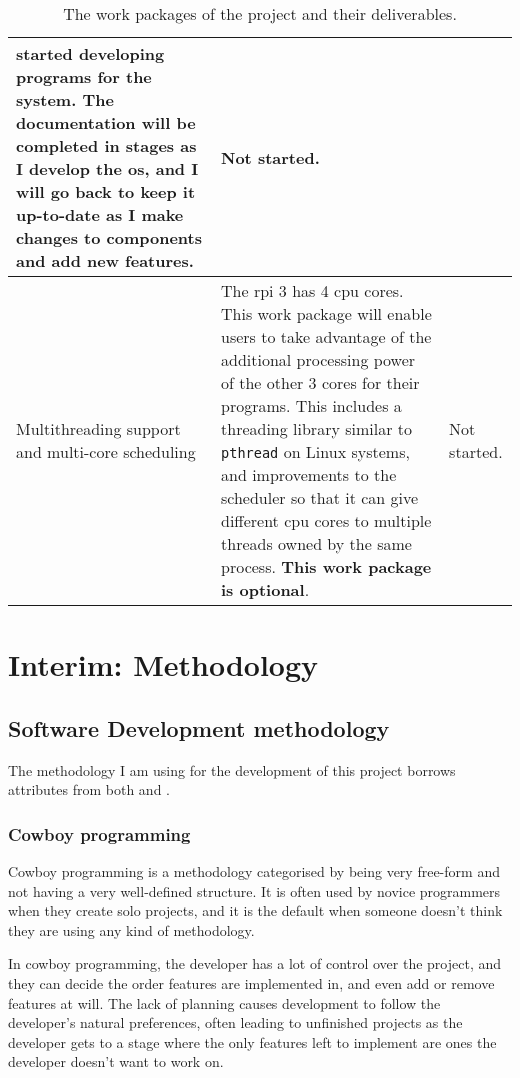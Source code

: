 \documentclass{article}
\begin{document}
\begin{table}[tbp]
\begin{center}
\begin{tabularx}{\textwidth}{|p{}|X|p{}|}
    started developing programs for the system. The documentation will be
    completed in stages as I develop the \gls{os}, and I will go back
    to keep it up-to-date as I make changes to components and add new
    features. &
    Not started.
    \\ \hline
    \makecell[lt]{Multithreading support \\ and multi-core scheduling} &
    The \gls{rpi} 3 has 4 \gls{cpu} cores. This work package will enable users
    to take advantage of the additional processing power of the other 3 cores
    for their programs. This includes a threading library similar to
    \texttt{pthread} on Linux systems, and improvements to the scheduler so
    that it can give different \gls{cpu} cores to multiple threads owned by the
    same process. \textbf{This work package is optional}. &
    Not started.
    \\ \hline
\end{tabularx}
\caption{The work packages of the project and their deliverables.}
\label{tab:work-packages}
\end{center}
\end{table}




\clearpage
\section{Interim: Methodology}

\subsection{Software Development methodology}
The methodology I am using for the development of this project borrows
attributes from both  and
.

\subsubsection{Cowboy programming}
\label{sec:cowboy_programming}
Cowboy programming is a methodology categorised by being very free-form and not
having a very well-defined structure. It is often used by novice programmers
when they create solo projects, and it is the default when someone doesn't
think they are using any kind of methodology.

In cowboy programming, the developer has a lot of control over the project,
and they can decide the order features are implemented in, and even add or
remove features at will. The lack of planning causes development to follow the
developer's natural preferences, often leading to unfinished projects as the
developer gets to a stage where the only features left to implement are ones
the developer doesn't want to work on.
\end{document}
